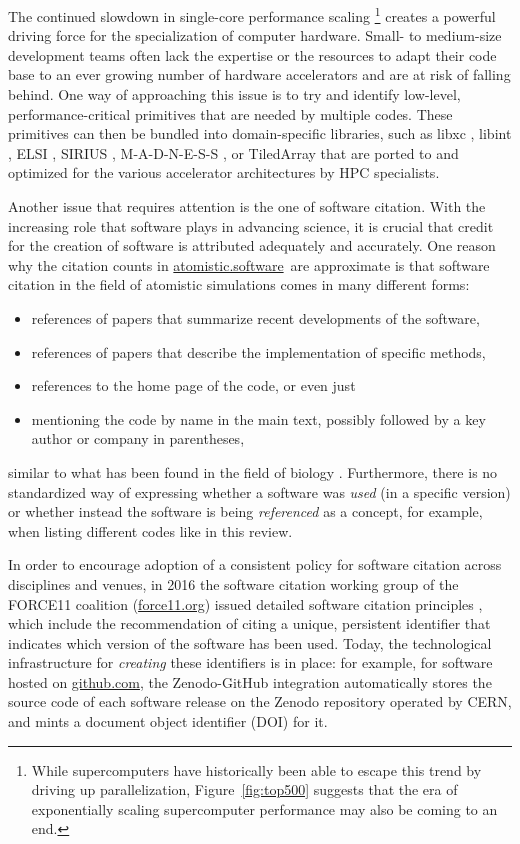 \documentclass[9pt,review,pubversion]{livecoms}
\newcommand{\atsoft}{\href{https://atomistic.software}{atomistic.software}\ }
\begin{document}
The continued slowdown in single-core performance scaling%
\footnote{While supercomputers have historically been able to escape this trend by driving up parallelization, Figure~\ref{fig:top500} suggests that the era of exponentially scaling supercomputer performance may also be coming to an end.}
creates a powerful driving force for the specialization of computer hardware.
Small- to medium-size development teams often lack the expertise or the resources to adapt their code base to an ever growing number of hardware accelerators and are at risk of falling behind.
One way of approaching this issue is to try and identify low-level, performance-critical primitives that are needed by multiple codes. 
These primitives can then be bundled into domain-specific libraries, such as libxc \cite{Lehtola2018}, libint \cite{Valeyev2021}, ELSI \cite{Yu2020}, SIRIUS \cite{Sirius2021}, M-A-D-N-E-S-S \cite{Harrison2016}, or TiledArray \cite{Calvin2021} that are ported to and optimized for the various accelerator architectures by HPC specialists.

Another issue that requires attention is the one of software citation.
With the increasing role that software plays in advancing science, it is crucial that credit for the creation of software is attributed adequately and accurately.
One reason why the citation counts in \atsoft are approximate is that software citation in the field of atomistic simulations comes in many different forms: 
\begin{itemize}
    \item references of papers that summarize recent developments of the software,
    \item references of papers that describe the implementation of specific methods,
    \item references to the home page of the code, or even just
    \item mentioning the code by name in the main text, possibly followed by a key author or company in parentheses,
\end{itemize}
similar to what has been found in the field of biology \cite{Howison2016}.
Furthermore, there is no standardized way of expressing whether a software was \emph{used} (in a specific version) or whether instead the software is being \emph{referenced} as a concept, for example, when listing different codes like in this review.

In order to encourage adoption of a consistent policy for software citation across disciplines and venues, in 2016 the software citation working group of the FORCE11 coalition (\url{force11.org}) issued detailed software citation principles \cite{Smith2016}, which include the recommendation of citing a unique, persistent identifier that indicates which version of the software has been used.
Today, the technological infrastructure for \emph{creating} these identifiers is in place:
for example, for software hosted on \url{github.com}, the Zenodo-GitHub integration \cite{zenodo-github-integration} automatically stores the source code of each software release on the Zenodo repository operated by CERN, and mints a document object identifier (DOI) for it.
\end{document}
